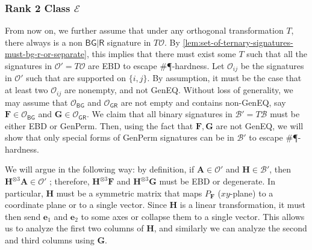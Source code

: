 \documentclass[11pt]{article}
\newcommand{\db}{\mathsf{B}}
\newcommand{\dg}{\mathsf{G}}
\newcommand{\dr}{\mathsf{R}}
\newcommand{\geneq}{\textsf{GenEQ}\xspace}
\newcommand{\genperm}{\textsf{GenPerm}\xspace}
\newcommand{\teh}{^{\otimes 3}}
\newcommand{\strspt}{\textsf{EBD}\xspace}
\newcommand{\tractBGGRBR}{$\mathscr{E}$\xspace}
\begin{document}
\subsubsection{Rank 2 Class \texorpdfstring{\tractBGGRBR}{E}}
\label{subsec:cannot-be-made-bg-r}
From now on, we further assume that under any orthogonal transformation $T$, there always is a non $\db \dg | \dr$ signature in $T \mathcal{O}$.
By \cref{lem:set-of-ternary-signatures-must-bg-r-or-separate}, this implies that there must exist some $T$ such that all the signatures in $\mathcal{O}' = T \mathcal{O}$ are \strspt to escape \#\P-hardness.
Let $\mathcal{O}_{ij}$ be the signatures in $\mathcal{O}'$ such that are supported on $\{i, j\}$.
By assumption, it must be the case that at least two $\mathcal{O}_{ij}$ are nonempty, and not \geneq.
Without loss of generality, we may assume that $\mathcal{O}_{\db \dg}$ and $\mathcal{O}_{\dg \dr}$ are not empty and contains non-\geneq, say
$\mathbf{F} \in \mathcal{O}_{\db \dg}$ and $\mathbf{G} \in \mathcal{O}_{\dg \dr}$.
We claim that all binary signatures in $\mathcal{B}' = T \mathcal{B}$ must be either \strspt or \genperm.
Then, using the fact that $\mathbf{F}, \mathbf{G}$ are not \geneq, we will show that only special forms of \genperm signatures can be in $\mathcal{B}'$ to escape \#\P-hardness.

We will argue in the following way: 
by definition, if $\mathbf{A} \in \mathcal{O}'$ and $\mathbf{H} \in \mathcal{B}'$, then $\mathbf{H}\teh \mathbf{A} \in \mathcal{O}'$
;
therefore, $\mathbf{H}\teh \mathbf{F}$ and $\mathbf{H}\teh \mathbf{G}$ must be \strspt or degenerate.
In particular, $\mathbf{H}$ must be a symmetric matrix that maps $P_{\mathbf{F}}$ ($xy$-plane) to a coordinate plane or to a single vector.
Since $\mathbf{H}$ is a linear transformation, it must then send $\mathbf{e}_1$ and $\mathbf{e}_2$ to some axes or collapse them to a single vector.
This allows us to analyze the first two columns of $\mathbf{H}$, and similarly we can analyze the second and third columns using $\mathbf{G}$.
\end{document}
